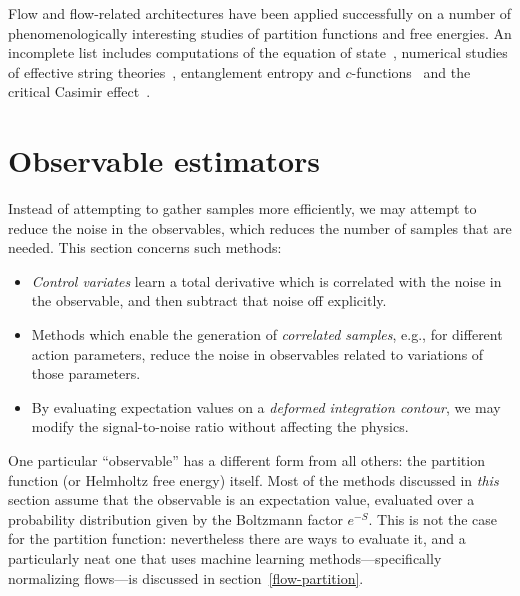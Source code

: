 \documentclass[12pt]{article}
\begin{document}
Flow and flow-related architectures have been applied successfully on a number of phenomenologically interesting studies of partition functions and free energies. An incomplete list includes computations of the equation of state~\cite{Caselle:2016wsw,Caselle:2018kap,Nicoli:2020njz}, numerical studies of effective string theories~\cite{Caselle:2023mvh,Caselle:2024ent}, entanglement entropy and $c$-functions~\cite{Alba:2016bcp,Bulgarelli:2023ofi,Bulgarelli:2024onj} and the critical Casimir effect~\cite{Bulgarelli:2025riv}.

\section{Observable estimators}\label{sec:estimators}

Instead of attempting to gather samples more efficiently, we may attempt to reduce the noise in the observables, which reduces the number of samples that are needed. This section concerns such methods:
\begin{itemize}
    \item \emph{Control variates} learn a total derivative which is correlated with the noise in the observable, and then subtract that noise off explicitly.
    \item Methods which enable the generation of \emph{correlated samples}, e.g., for different action parameters, reduce the noise in observables related to variations of those parameters.
    \item By evaluating expectation values on a \emph{deformed integration contour}, we may modify the signal-to-noise ratio without affecting the physics.
\end{itemize}

One particular ``observable'' has a different form from all others: the partition function (or Helmholtz free energy) itself. Most of the methods discussed in \emph{this} section assume that the observable is an expectation value, evaluated over a probability distribution given by the Boltzmann factor $e^{-S}$. This is not the case for the partition function: nevertheless there are ways to evaluate it, and a particularly neat one that uses machine learning methods---specifically normalizing flows---is discussed in section~\ref{flow-partition}.
\end{document}
